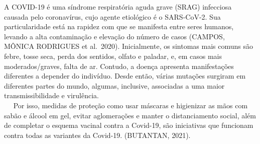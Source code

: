 \documentclass[
]{article}
\begin{document}
A COVID-19 é uma síndrome respiratória aguda grave (SRAG) infecciosa
causada pelo coronavírus, cujo agente etiológico é o SARS-CoV-2. Sua
particularidade está na rapidez com que se manifesta entre seres
humanos, levando a alta contaminação e elevação do número de casos
(CAMPOS, MÔNICA RODRIGUES et al.~2020). Inicialmente, os sintomas mais
comuns são febre, tosse seca, perda dos sentidos, olfato e paladar, e,
em casos mais moderados/graves, falta de ar. Contudo, a doença apresenta
manifestações diferentes a depender do indivíduo. Desde então, várias
mutações surgiram em diferentes partes do mundo, algumas, inclusive,
associadas a uma maior transmissibilidade e virulência.\\
  Por isso, medidas de proteção como usar máscaras e higienizar as mãos
com sabão e álcool em gel, evitar aglomerações e manter o distanciamento
social, além de completar o esquema vacinal contra a Covid-19, são
iniciativas que funcionam contra todas as variantes da Covid-19.
(BUTANTAN, 2021).
\end{document}
